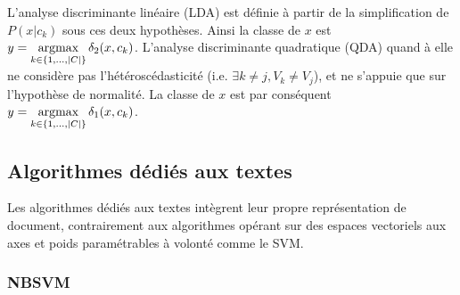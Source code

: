 L'analyse discriminante linéaire (LDA) \citep{fisher1936linearDA} %
est définie à partir de la simplification de $P(x \vert c_k)$ sous ces deux hypothèses. Ainsi la classe de $x$ est $y = \mathop{\mathrm{argmax}}\limits_{k \in \lbrace 1,...,{\vert C\vert} \rbrace} \delta_2(x, c_k)$.
L'analyse discriminante quadratique (QDA) \citep{McLachlan1992DiscrAnalyStatPattRecog-QDA} quand à elle ne considère pas l'hétéroscédasticité (i.e. $\exists k \neq j, V_k \neq V_j$), et ne s'appuie que sur l'hypothèse de normalité. La classe de $x$ est par conséquent $y = \mathop{\mathrm{argmax}}\limits_{k \in \lbrace 1,...,{\vert C\vert} \rbrace} \delta_1(x, c_k)$.



\subsection{Algorithmes dédiés aux textes}
Les algorithmes dédiés aux textes intègrent leur propre représentation de document, contrairement aux algorithmes opérant sur des espaces vectoriels aux axes et poids paramétrables à volonté comme le SVM. %


\subsubsection{NBSVM}

